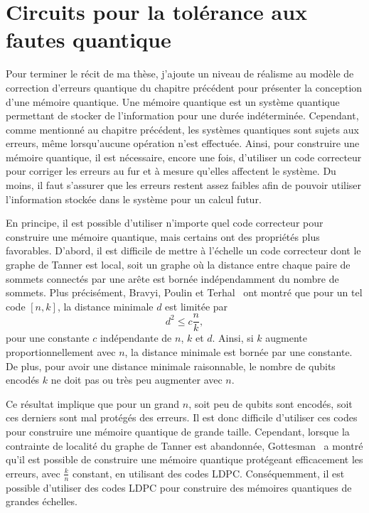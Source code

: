 \begin{comment}
\end{comment}

\chapter{Circuits pour la tolérance aux fautes quantique}

Pour terminer le récit de ma thèse,
j'ajoute un niveau de réalisme au modèle de correction d'erreurs quantique
du chapitre précédent pour présenter la conception d'une mémoire quantique.
Une mémoire quantique est un système quantique permettant de stocker
de l'information pour une durée indéterminée.
Cependant,
comme mentionné au chapitre précédent,
les systèmes quantiques sont sujets aux erreurs,
même lorsqu'aucune opération n'est effectuée.
Ainsi,
pour construire une mémoire quantique,
il est nécessaire, encore une fois,
d'utiliser un code correcteur pour corriger les erreurs au fur et à mesure
qu'elles affectent le système.
Du moins,
il faut s'assurer que les erreurs restent assez faibles afin de pouvoir utiliser
l'information stockée dans le système pour un calcul futur.

En principe,
il est possible d'utiliser n'importe quel code correcteur pour construire
une mémoire quantique,
mais certains ont des propriétés plus favorables.
D'abord,
il est difficile de mettre à l'échelle un code correcteur dont le graphe
de Tanner est local, soit un graphe où la distance entre chaque paire de sommets 
connectés par une arête est bornée indépendamment du nombre de sommets.
Plus précisément,
Bravyi, Poulin et Terhal~\cite{bravyi_tradeoffs_2010}
ont montré que pour un tel code $[n, k]$,
la distance minimale $d$ est limitée par
\begin{equation}
	d^2 \leq c \frac{n}{k},
\end{equation}
pour une constante $c$ indépendante de $n$, $k$ et $d$.
Ainsi,
si $k$ augmente proportionnellement avec $n$,
la distance minimale est bornée par une constante.
De plus,
pour avoir une distance minimale raisonnable,
le nombre de qubits encodés $k$ 
ne doit pas ou très peu augmenter avec $n$.

Ce résultat implique que pour un grand $n$,
soit peu de qubits sont encodés,
soit ces derniers sont mal protégés des erreurs.
Il est donc difficile d'utiliser ces codes pour construire une mémoire 
quantique de grande taille.
Cependant,
lorsque la contrainte de localité du graphe de Tanner est abandonnée,
Gottesman~\cite{gottesman_fault-tolerant_2013} a montré qu'il est possible 
de construire une mémoire quantique protégeant efficacement les erreurs,
avec $\frac{k}{n}$ constant, en utilisant des codes LDPC.
Conséquemment,
il est possible d'utiliser des codes LDPC pour construire 
des mémoires quantiques de grandes échelles.

